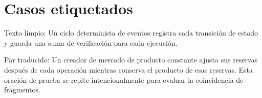 \section{Casos etiquetados}

Texto limpio: Un ciclo determinista de eventos registra cada transición de estado y
guarda una suma de verificación para cada ejecución.

Par traducido: Un creador de mercado de producto constante ajusta sus reservas después
de cada operación mientras conserva el producto de esas reservas. Esta oración de
prueba se repite intencionalmente para evaluar la coincidencia de fragmentos.
\cite{fixture2026}
